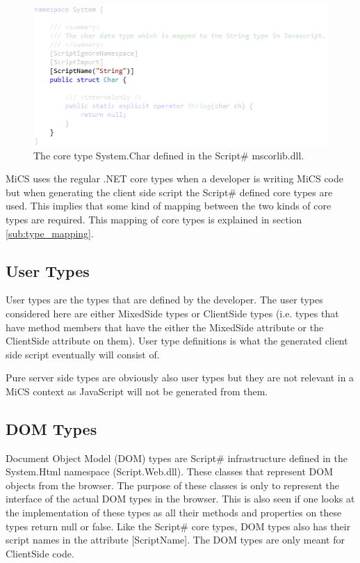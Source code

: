 	\begin{figure}[H]
			\includegraphics[width=13cm]{resources/images/Char.png}
		\caption{The core type System.Char defined in the Script\# mscorlib.dll.}
		\label{char}
	\end{figure}

		MiCS uses the regular .NET core types when a developer is writing MiCS code but when generating the client side script the Script\# defined core types are used. This implies that some kind of mapping between the two kinds of core types are required. This mapping of core types is explained in section \ref{sub:type_mapping}.

	\subsection{User Types} %
	\label{sub:user_types}
		User types are the types that are defined by the developer. The user types considered here are either MixedSide types or ClientSide types (i.e. types that have method members that have the either the MixedSide attribute or the ClientSide attribute on them). User type definitions is what the generated client side script eventually will consist of. 

		Pure server side types are obviously also user types but they are not relevant in a MiCS context as JavaScript will not be generated from them.

	\subsection{DOM Types} %
	\label{sub:dom_types}
		Document Object Model (DOM) types are Script\# infrastructure defined in the System.Html namespace (Script.Web.dll). These classes that represent DOM objects from the browser. The purpose of these classes is only to represent the interface of the actual DOM types in the browser. This is also seen if one looks at the implementation of these types as all their methods and properties on these types return null or false. Like the Script\# core types, DOM types also has their script names in the attribute [ScriptName]. The DOM types are only meant for ClientSide code.

